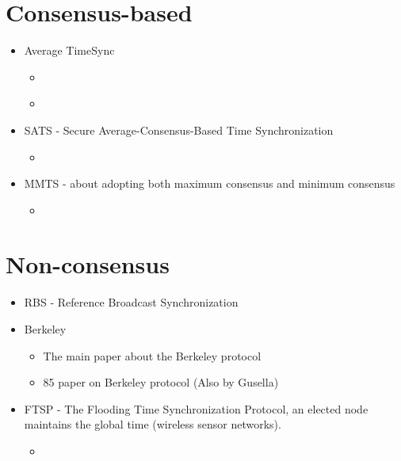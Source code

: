 \documentclass[a4paper,12pt]{article}
\begin{document}
\section{Consensus-based}

\begin{itemize}
\item Average TimeSync
  \begin{itemize}
  \item \cite{SchenatoGamba07}
  \item \cite{LucaFiorentin11}
  \end{itemize}
\end{itemize}

\begin{itemize}
\item SATS - Secure Average-Consensus-Based Time Synchronization
  \begin{itemize}
  \item \cite{HeChengShiChen13}
  \end{itemize}
\end{itemize}

\begin{itemize}
\item MMTS - about adopting both maximum consensus and minimum consensus
  \begin{itemize}
  \item \cite{HeLiChenCheng13}
  \end{itemize}
\end{itemize}

\section{Non-consensus}

\begin{itemize}
\item \cite{ElsonGirodEstrin02} RBS - Reference Broadcast Synchronization
\item Berkeley
  \begin{itemize}
  \item \cite{Gusella89} The main paper about the Berkeley protocol
  \item \cite{GusellaZatti85} 85 paper on Berkeley protocol (Also by Gusella)
  \end{itemize}
\item FTSP - The Flooding Time Synchronization Protocol, an elected node maintains the global time (wireless sensor networks).
    \begin{itemize}
        \item \cite{Maroti04} 
    \end{itemize}
\end{itemize}
\end{document}
